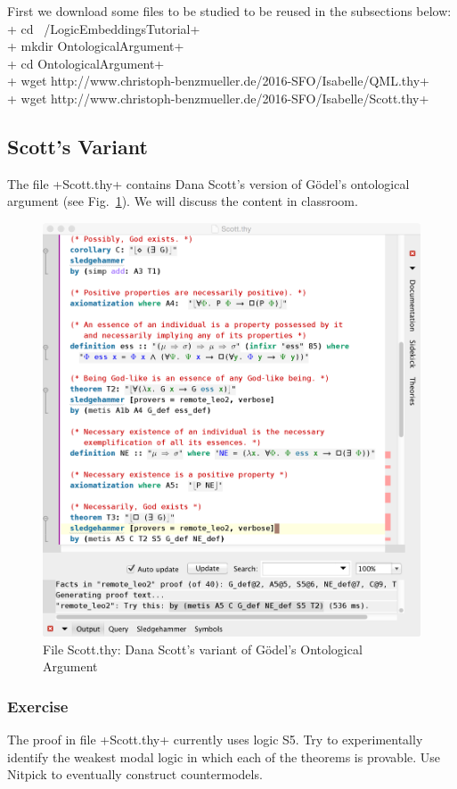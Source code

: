 \documentclass{article}
\begin{document}
First we download some files to be studied to be reused in the
subsections below:\\[1em]
+ cd ~/LogicEmbeddingsTutorial+\\
+ mkdir OntologicalArgument+ \\
+ cd OntologicalArgument+ \\
+ wget http://www.christoph-benzmueller.de/2016-SFO/Isabelle/QML.thy+\\
+ wget http://www.christoph-benzmueller.de/2016-SFO/Isabelle/Scott.thy+  \\

\subsection{Scott's Variant}
The file +Scott.thy+ contains Dana Scott's version of G\"odel's ontological
argument (see Fig.~\ref{Scott.thy}). We will discuss the content in classroom.

\begin{figure}[t]
\centerline{\includegraphics[width=.7\columnwidth]{./Images/Scott.png}}
\caption{File Scott.thy: Dana Scott's variant of G\"odel's Ontological Argument} \label{Scott.thy}
\end{figure}

\subsubsection{Exercise}
The proof in file +Scott.thy+ currently uses logic S5. Try to
experimentally identify the weakest modal logic in which each of the
theorems is provable. Use Nitpick to eventually construct countermodels.
\end{document}

